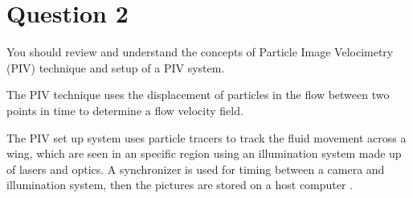 \section{Question 2}
\begin{importantbox}
    You should review and understand the concepts of Particle Image Velocimetry (PIV) technique and setup of a PIV system. 
\end{importantbox}

The PIV technique uses the displacement of particles in the flow between two points in time to determine a flow velocity field. 

The PIV set up system uses particle tracers to track the fluid movement across a wing, which are seen in an specific region using an illumination system made up of lasers and optics. A synchronizer is used for timing between a camera and illumination system, then the pictures are stored on a host computer \citep{lecture11}.